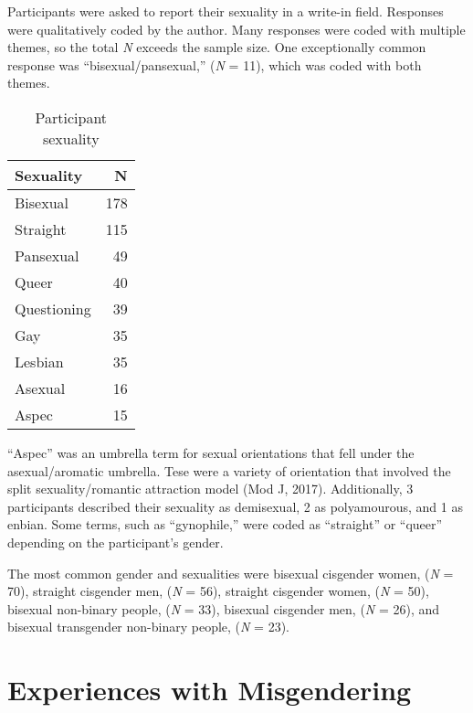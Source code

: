 \documentclass[12pt,twoside]{reedthesis}
\begin{document}
Participants were asked to report their sexuality in a write-in field. Responses were qualitatively coded by the author. Many responses were coded with multiple themes, so the total \emph{N} exceeds the sample size. One exceptionally common response was ``bisexual/pansexual,'' (\emph{N} = 11), which was coded with both themes.
\begin{longtable}[t]{lr}
\caption{\label{tab:unnamed-chunk-2}Participant sexuality}\\
\toprule
Sexuality & N\\
\midrule
Bisexual & 178\\
Straight & 115\\
Pansexual & 49\\
Queer & 40\\
Questioning & 39\\
\addlinespace
Gay & 35\\
Lesbian & 35\\
Asexual & 16\\
Aspec & 15\\
\bottomrule
\end{longtable}
``Aspec'' was an umbrella term for sexual orientations that fell under the asexual/aromatic umbrella. Tese were a variety of orientation that involved the split sexuality/romantic attraction model (Mod J, 2017). Additionally, 3 participants described their sexuality as demisexual, 2 as polyamourous, and 1 as enbian. Some terms, such as ``gynophile,'' were coded as ``straight'' or ``queer'' depending on the participant's gender.

The most common gender and sexualities were bisexual cisgender women, (\emph{N} = 70), straight cisgender men, (\emph{N} = 56), straight cisgender women, (\emph{N} = 50), bisexual non-binary people, (\emph{N} = 33), bisexual cisgender men, (\emph{N} = 26), and bisexual transgender non-binary people, (\emph{N} = 23).

\hypertarget{experiences-with-misgendering}{%
\section{Experiences with Misgendering}\label{experiences-with-misgendering}}
\end{document}
